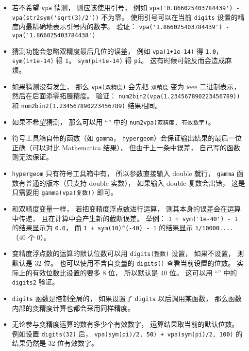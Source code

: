 \begin{itemize}
\item  若不希望 \verb`vpa` 猜测， 则应该使用引号， 例如 \verb`vpa('0.866025403784439') - vpa(str2sym('sqrt(3)/2'))` 不为零。 使用引号可以在当前 \verb`digits` 设置的精度内最精确地表示引号内的数字。 验证： \verb`vpa('1.866025403784439') - vpa('1.866025403784438')`

\item 猜测功能会忽略双精度最后几位的误差， 例如 \verb`vpa(1+1e-14)` 得 \verb`1.0`， \verb`sym(1+1e-14)` 得 \verb`1`。 \verb`sym(pi+1e-14)` 得 \verb`pi`。 这有时候可能反而会造成麻烦。

\item 如果猜测没有发生， 那么 \verb`vpa(双精度)` 会先把 \verb`双精度` 变为 ieee 二进制表示， 然后在后面添零拓展精度。 验证： \verb`num2bin2(vpa(1.234567890223456789))` 和 \verb`num2bin2(1.234567890223456789)` 结果相同。

\item 如果不希望猜测， 那么可以用 “” 中的 \verb`num2vpa(双精度, 有效数字)`。

\item 符号工具箱自带的函数（如 \verb`gamma`， \verb`hypergeom`）会保证输出结果的最后一位正确（可以对比 Mathematica 结果）， 但由于上一条中误差， 自己写的函数则无法保证。

\item \verb`hypergeom` 只有符号工具箱中有， 所以参数直接输入 double 就行， \verb`gamma` 函数有普通的版本（只支持 double 实数）， 如果输入 double 复数会出错， 这是只需要用 \verb`gamma(vpa(复数))` 即可。

\item 和双精度变量一样， 若把变精度浮点数进行运算， 则其本身的误差会在运算中传递， 且在计算中会产生新的截断误差。 举例： \verb`1 + sym('1e-40') - 1` 的结果显示为 \verb`0.0`， 而 \verb`1 + sym(10)^(-40) - 1` 的结果显示 \verb`1/10000....`（40 个 0）。

\item 变精度浮点数的运算的默认位数可以用 \verb`digits(整数)` 设置， 如果不设置， 则默认是 32 位。 也可以使用不含自变量的 \verb`digits()` 查看当前设置的位数。 实际上的有效位数比设置的要多 8 位， 所以默认是 40 位。 这可以用 “” 中的 \verb`digits2` 验证。

\item \verb`digits` 函数是控制全局的， 如果设置了 \verb`digits` 以后调用某函数， 那么函数内部的变精度计算也都会采用同样精度。

\item 无论参与变精度运算的数有多少个有效数字， 运算结果取当前的默认位数。 例如设置 \verb`digits(32)` 后， \verb`vpa(sym(pi)/2, 50) + vpa(sym(pi)/2, 100)` 的结果仍然是 32 位有效数字。


\end{itemize}
